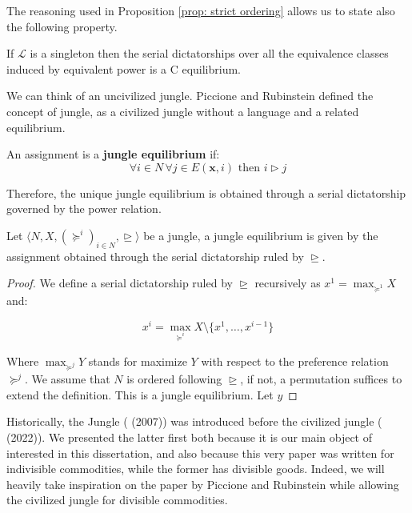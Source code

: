 The reasoning used in Proposition \ref{prop: strict ordering} allows us to state also the following property.

\begin{proposition}\label{prop: L singleton}
    If $\mathcal{L}$ is a singleton then the serial dictatorships over all the equivalence classes induced by equivalent power is a C equilibrium.  
\end{proposition}

We can think of an uncivilized jungle. Piccione and Rubinstein \cite[PR]{P-R} defined the concept of jungle, as a civilized jungle without a language and a related equilibrium.

\begin{definition}
    An assignment is a \textbf{jungle equilibrium} if: \[\forall i \in N \, \forall j \in E(\textbf{x},i) \text{ then } i\triangleright j\]
\end{definition}

Therefore, the unique jungle equilibrium is obtained through a serial dictatorship governed by the power relation. 

\begin{proposition}
    Let $\langle N,X,(\succeq^i)_{i\in N}, \trianglerighteq\rangle$ be a jungle, a jungle equilibrium is given by the assignment obtained through the serial dictatorship ruled by $\trianglerighteq$.

    \begin{proof}
        We define a serial dictatorship ruled by $\trianglerighteq$ recursively as $x^1=\max_{\succeq^1}X$ and:

        \[x^i=\max_{\succeq^i}X\setminus\{x^1,\dots,x^{i-1}\}\]

        Where $\max_{\succeq^j}Y$ stands for maximize $Y$ with respect to the preference relation $\succeq^j$. We assume that $N$ is ordered following $\trianglerighteq$, if not, a permutation suffices to extend the definition. This is a jungle equilibrium. Let $y$ 
    \end{proof}
\end{proposition}

Historically, the Jungle (\cite[PR]{P-R} (2007)) was introduced before the civilized jungle (\cite[RY]{RY} (2022)). We presented the latter first both because it is our main object of interested in this dissertation, and also because this very paper was written for indivisible commodities, while the former has divisible goods. Indeed, we will heavily take inspiration on the paper by Piccione and Rubinstein while allowing the civilized jungle for divisible commodities. 

